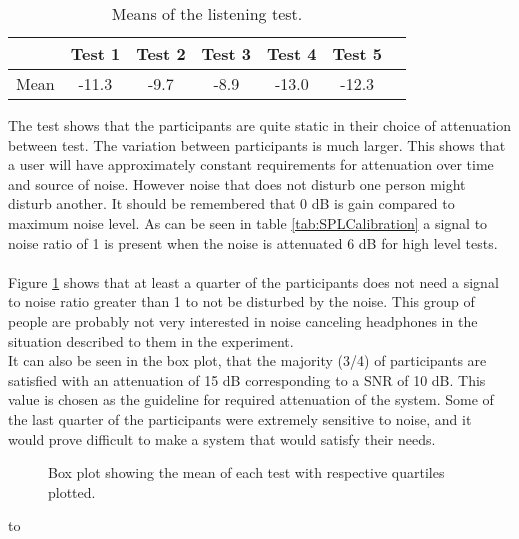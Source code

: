 \begin{table}[H]
	\centering
	\begin{tabular}{*{7}{c}}
		\hline
		& Test 1 & Test 2 & Test 3  & Test 4  & Test 5  
		\\
		\hline
		Mean & -11.3 & -9.7 & -8.9	 & -13.0 & -12.3 \\
		\hline
	\end{tabular}
	\caption{Means of the listening test.}
	\label{tab:MeanListeningResults}
\end{table}
The test shows that the participants are quite static in their choice of attenuation between test. The variation between participants is much larger. This shows that a user will have approximately constant requirements for attenuation over time and source of noise. However noise that does not disturb one person might disturb another.  
It should be remembered that 0 dB is gain compared to maximum noise level. As can be seen in table \ref{tab:SPLCalibration} a signal to noise ratio of 1 is present when the noise is attenuated 6 dB for high level tests. \\\\
Figure \ref{fig:ResAttExp} shows that at least a quarter of the participants does not need a signal to noise ratio greater than 1 to not be disturbed by the noise. This group of people are probably not very interested in noise canceling headphones in the situation described to them in the experiment. \\
It can also be seen in the box plot, that the majority (3/4) of participants are satisfied with an attenuation of 15 dB corresponding to a SNR of 10 dB. This value is chosen as the guideline for required attenuation of the system. Some of the last quarter of the participants were extremely sensitive to noise, and it would prove difficult to make a system that would satisfy their needs. 

\begin{figure}[H]
	\centering
	
	\caption{Box plot showing the mean of each test with respective quartiles plotted.}
	\label{fig:ResAttExp}
\end{figure}
to

